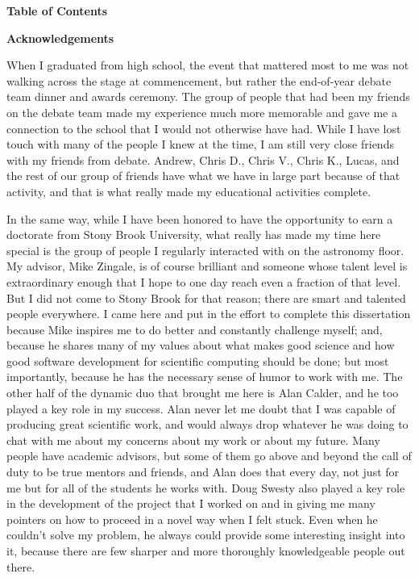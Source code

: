 \documentclass[12pt]{article}
\begin{document}
\newpage
\centerline{\bf{Table of Contents}}
\renewcommand*\contentsname{}
\tableofcontents

\newpage

\listoffigures

\listoftables



\newpage
\centerline{\bf{Acknowledgements}}
\vspace*{2\baselineskip}
When I graduated from high school, the event that mattered most to me was 
not walking across the stage at commencement, but rather the end-of-year 
debate team dinner and awards ceremony. The group of people that had been
my friends on the debate team made my experience much more memorable and 
gave me a connection to the school that I would not otherwise have had.
While I have lost touch with many of the people I knew at the time, I am 
still very close friends with my friends from debate. Andrew, Chris D.,
Chris V., Chris K., Lucas, and the rest of our group of friends have 
what we have in large part because of that activity, and that is what 
really made my educational activities complete.

In the same way, while I have been honored to have the opportunity to 
earn a doctorate from Stony Brook University, what really has made my 
time here special is the group of people I regularly interacted with 
on the astronomy floor. My advisor, Mike Zingale, is of course brilliant 
and someone whose talent level is extraordinary enough that I hope to 
one day reach even a fraction of that level. But I did not come to Stony 
Brook for that reason; there are smart and talented people everywhere. 
I came here and put in the effort to complete this dissertation because 
Mike inspires me to do better and constantly challenge myself;
and, because he shares many of my values about what makes good science and 
how good software development for scientific computing should be done;
but most importantly, because he has the necessary sense of humor to work 
with me. The other half of the dynamic duo that brought me here is Alan 
Calder, and he too played a key role in my success. Alan never let me 
doubt that I was capable of producing great scientific work, and would 
always drop whatever he was doing to chat with me about my concerns about 
my work or about my future. Many people have academic advisors, but some 
of them go above and beyond the call of duty to be true mentors and friends,
and Alan does that every day, not just for me but for all of the students 
he works with. Doug Swesty also played a key role in the development of the 
project that I worked on and in giving me many pointers on how to proceed 
in a novel way when I felt stuck. Even when he couldn't solve my problem, 
he always could provide some interesting insight into it, because there 
are few sharper and more thoroughly knowledgeable people out there.
\end{document}
